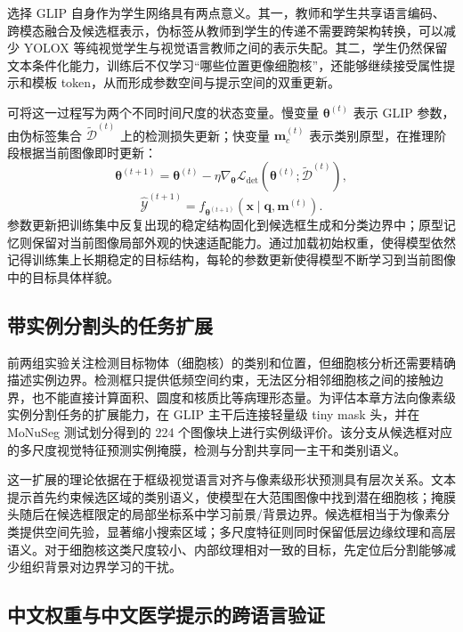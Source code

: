 选择 GLIP 自身作为学生网络具有两点意义。其一，教师和学生共享语言编码、跨模态融合及候选框表示，伪标签从教师到学生的传递不需要跨架构转换，可以减少 YOLOX 等纯视觉学生与视觉语言教师之间的表示失配。其二，学生仍然保留文本条件化能力，训练后不仅学习“哪些位置更像细胞核”，还能够继续接受属性提示和模板 token，从而形成参数空间与提示空间的双重更新。

可将这一过程写为两个不同时间尺度的状态变量。慢变量 $\boldsymbol\theta^{(t)}$ 表示 GLIP 参数，由伪标签集合 $\widetilde{\mathcal D}^{(t)}$ 上的检测损失更新；快变量 $\boldsymbol m_c^{(t)}$ 表示类别原型，在推理阶段根据当前图像即时更新：
\begin{equation}
\boldsymbol\theta^{(t+1)}
=\boldsymbol\theta^{(t)}
-\eta\nabla_{\boldsymbol\theta}
\mathcal L_{\mathrm{det}}
(\boldsymbol\theta^{(t)};\widetilde{\mathcal D}^{(t)}),
\end{equation}
\begin{equation}
\widehat{\mathcal Y}^{(t+1)}
=f_{\boldsymbol\theta^{(t+1)}}(
\boldsymbol x\mid\boldsymbol q,\boldsymbol m^{(t)}).
\end{equation}
参数更新把训练集中反复出现的稳定结构固化到候选框生成和分类边界中；原型记忆则保留对当前图像局部外观的快速适配能力。通过加载初始权重，使得模型依然记得训练集上长期稳定的目标结构，每轮的参数更新使得模型不断学习到当前图像中的目标具体样貌。

\subsection{带实例分割头的任务扩展}

前两组实验关注检测目标物体（细胞核）的类别和位置，但细胞核分析还需要精确描述实例边界。检测框只提供低频空间约束，无法区分相邻细胞核之间的接触边界，也不能直接计算面积、圆度和核质比等病理形态量。为评估本章方法向像素级实例分割任务的扩展能力，在 GLIP 主干后连接轻量级 tiny mask 头，并在 MoNuSeg 测试划分得到的 224 个图像块上进行实例级评价。该分支从候选框对应的多尺度视觉特征预测实例掩膜，检测与分割共享同一主干和类别语义。

这一扩展的理论依据在于框级视觉语言对齐与像素级形状预测具有层次关系。文本提示首先约束候选区域的类别语义，使模型在大范围图像中找到潜在细胞核；掩膜头随后在候选框限定的局部坐标系中学习前景/背景边界。候选框相当于为像素分类提供空间先验，显著缩小搜索区域；多尺度特征则同时保留低层边缘纹理和高层语义。对于细胞核这类尺度较小、内部纹理相对一致的目标，先定位后分割能够减少组织背景对边界学习的干扰。

\subsection{中文权重与中文医学提示的跨语言验证}

